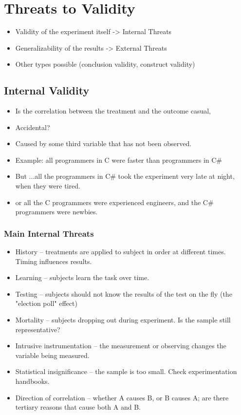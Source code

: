 \chapter{Threats to Validity}
\begin{itemize}
\item Validity of the experiment itself -> Internal Threats
\item Generalizability of the results -> External Threats
\item Other types possible (conclusion validity, construct validity)
\end{itemize}

\section{Internal Validity}
\begin{itemize}
\item Is the correlation between the treatment and the outcome casual,
\item Accidental?
\item Caused by some third variable that has not been observed.
\item Example: all programmers in C were faster than programmers in C\#
\item But ...all the programmers in C\# took the experiment very late at night, when they were tired.
\item or all the C programmers were experienced engineers, and the C\# programmers were newbies.
\end{itemize}

\subsection{Main Internal Threats}
\begin{itemize}
\item History -- treatments are applied to subject in order at different times. Timing influences results.
\item Learning -- subjects learn the task over time.
\item Testing -- subjects should not know the results of the test on the fly (the "election poll" effect)
\item Mortality -- subjects dropping out during experiment. Is the sample still representative?
\item Intrusive instrumentation -- the measurement or observing changes the variable being measured.
\item Statistical insignificance -- the sample is too small. Check experimentation handbooks.
\item Direction of correlation -- whether A causes B, or B causes A; are there tertiary reasons that cause both A and B.
\end{itemize}

